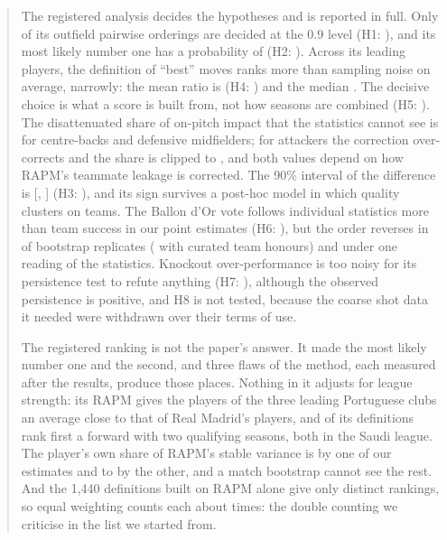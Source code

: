 \documentclass[11pt,a4paper]{article}
\begin{document}
\begin{abstract}
The registered analysis decides the hypotheses and is reported in full. Only
\SharePairsDecided{} of its outfield pairwise orderings are decided at the 0.9
level (H1: \VerdictHOne{}), and its most likely number one has a probability
of \TopPlayerPFirst{} (H2: \VerdictHTwo{}). Across its leading players, the
definition of ``best'' moves ranks more than sampling noise on average,
narrowly: the mean ratio is \HFourRatio{} (H4: \VerdictHFour{}) and the median
\HFourMedianRatio{}. The decisive choice is what a score is built from, not
how seasons are combined (H5: \VerdictHFive{}). The disattenuated share of
on-pitch impact that the statistics cannot see is \ShareHigh{} for
centre-backs and defensive midfielders; for attackers the correction
over-corrects and the share is clipped to \ShareLow{}, and both values depend
on how RAPM's teammate leakage is corrected. The 90\% interval of the
difference is [\ShareContrastParamLo, \ShareContrastParamHi] (H3:
\VerdictHThree{}), and its sign survives a post-hoc model in which quality
clusters on teams. The Ballon d'Or vote follows individual statistics more
than team success in our point estimates (H6: \VerdictHSix{}), but the order
reverses in \ShapleyTeamAboveStatsBoot{} of bootstrap replicates
(\CuratedTeamAboveStatsBoot{} with curated team honours) and under one reading
of the statistics. Knockout over-performance is too noisy for its persistence
test to refute anything (H7: \VerdictHSeven{}), although the observed
persistence is positive, and H8 is not tested, because the coarse shot data it
needed were withdrawn over their terms of use.

The registered ranking is not the paper's answer. It made \TopPlayerName{} the
most likely number one and \SecondPlayerName{} the second, and three flaws of
the method, each measured after the results, produce those places. Nothing in
it adjusts for league strength: its RAPM gives the players of the three
leading Portuguese clubs an average close to that of Real Madrid's players,
and \QuinonesSpecShare{} of its definitions rank first a forward with two
qualifying seasons, both in the Saudi league. The player's own share of
RAPM's stable variance is \AttrFullTotal{} by one of our estimates and
\AssortAttrLo{} to \AssortAttrHi{} by the other, and a match bootstrap cannot
see the rest. And the 1,440 definitions built on RAPM
alone give only \NDistinctRankingsImpact{} distinct rankings, so equal
weighting counts each about \ImpactRepeatMean{} times: the double counting we
criticise in the list we started from.


\end{abstract}
\end{document}
